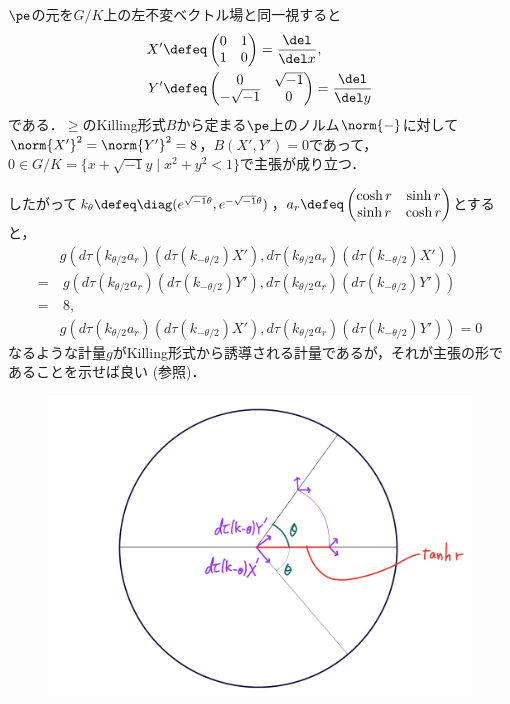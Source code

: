 \begin{npfwn}
  
  $\pe$の元を$G/K$上の左不変ベクトル場と同一視すると
  \begin{align*}
    X' &\defeq 
         \begin{pmatrix}
           0 & 1 \\ 1 & 0
         \end{pmatrix} = \dfrac{\del}{\del x},\\
    Y' &\defeq 
         \begin{pmatrix}
           0 & \sqrt{-1} \\ -\sqrt{-1} & 0
         \end{pmatrix} = \dfrac{\del}{\del y}
  \end{align*}
  である．$\ge$のKilling形式$B$から定まる$\pe$上のノルム$\norm{-} $に対して$\norm{X'}^2 = \norm{Y'}^2 = 8 $，$B(X', Y' ) = 0$であって，$0\in G/K =\{x+\sqrt{-1}y\mid x^2 + y^2 < 1 \}  $で主張が成り立つ．

  したがって$k_{\theta} \defeq \diag(e^{\sqrt{-1}\theta},e^{-\sqrt{-1}\theta}) $，$a_r\defeq
  \begin{pmatrix}
    \cosh r & \sinh r \\  \sinh r & \cosh r
  \end{pmatrix}
  $とすると，
  \begin{align*}
    &g(d\tau(k_{\theta/2}a_r)(d\tau(k_{-\theta/2})X'), d\tau(k_{\theta/2}a_r)(d\tau(k_{-\theta/2})X')) \\
    =&\ g (d\tau(k_{\theta/2}a_r)(d\tau(k_{-\theta/2})Y'), d\tau(k_{\theta/2}a_r)(d\tau(k_{-\theta/2})Y')) \\
    =&\ 8, \\
    &g(d\tau(k_{\theta/2}a_r)(d\tau(k_{-\theta/2})X'), d\tau(k_{\theta/2}a_r)(d\tau(k_{-\theta/2})Y'))  = 0
  \end{align*}
  なるような計量$g $がKilling形式から誘導される計量であるが，それが主張の形であることを示せば良い (参照)．

  \begin{figure}[H]
    \centering
    \includegraphics[scale=0.08]{../graph/riem-su11.png}
    \caption{}
    \label{fig:riem-metric-su11}
  \end{figure}



\end{npfwn}
